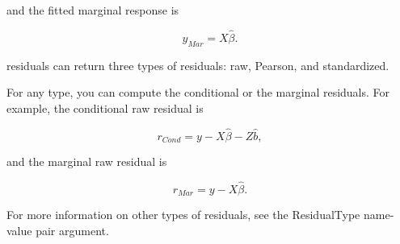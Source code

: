 \documentclass[residuals.tex]{subfiles}
\begin{document}
and the fitted marginal response is

\[ \hat{y}_{Mar} = X\hat{\beta}.\]

residuals can return three types of residuals: raw, Pearson, and standardized. 


For any type, you can compute the conditional or the marginal residuals. For example, the conditional raw residual is

\[ r_{Cond} = y−X\hat{\beta}−Z\hat{b},\]

and the marginal raw residual is 

\[ r_{Mar} = y−X\hat{\beta}.\]

For more information on other types of residuals, see the ResidualType name-value pair argument.
\end{document}
